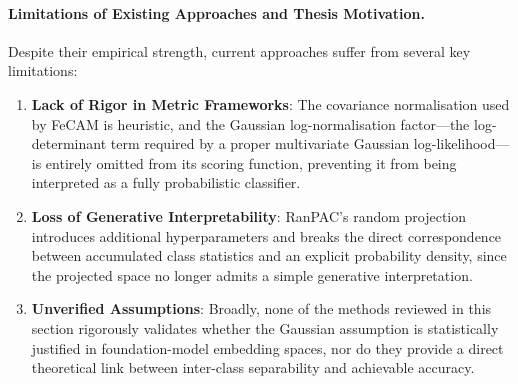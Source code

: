 \paragraph{Limitations of Existing Approaches and Thesis Motivation.}
Despite their empirical strength, current approaches suffer from several key limitations:
\begin{enumerate}
	\item \textbf{Lack of Rigor in Metric Frameworks}: The covariance normalisation used by FeCAM is heuristic, and the Gaussian log-normalisation factor---the log-determinant term required by a proper multivariate Gaussian log-likelihood---is entirely omitted from its scoring function, preventing it from being interpreted as a fully probabilistic classifier.
	\item \textbf{Loss of Generative Interpretability}: RanPAC's random projection introduces additional hyperparameters and breaks the direct correspondence between accumulated class statistics and an explicit probability density, since the projected space no longer admits a simple generative interpretation.
	\item \textbf{Unverified Assumptions}: Broadly, none of the methods reviewed in this section rigorously validates whether the Gaussian assumption is statistically justified in foundation-model embedding spaces, nor do they provide a direct theoretical link between inter-class separability and achievable accuracy.
\end{enumerate}


